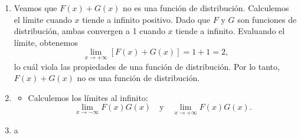 \documentclass{article}
\begin{document}
\begin{enumerate}
\begin{enumerate}[label={(\roman*)}]
        Consideremos \(a \in (0, 1)\) y verifiquemos las propiedades de la función.
        \begin{itemize}
            \item Calculemos los límites al infinito: 
            \[
            \lim_{x \to -\infty} aF(x) + (1 - a)G(x) \quad \text{y} \lim_{x \to +\infty} aF(x) + (1 - a)G(x).
            \]
            Ya que \(F\) y \(G\) son funciones de distribución, su límite cuando \(x\) tiende a infinito negativo es 0, por lo que al evaluar el límite tenemos:
            \[
            \lim_{x \to -\infty} aF(x) + (1 - a)G(x) = a(0) + (1 - a)(0) = 0.
            \]
            Análogamente, cuando \(x\) tiende a infinito positivo, el límite de \(F\) y \(G\) es 1. Por lo tanto,
            \[
            \lim_{x \to +\infty} aF(x) + (1 - a)G(x) = a(1) + (1 - a)(1) = a + 1 - a = 1.
            \]
            \item Dado que \(a \geq 0\), entonces la monotonicidad del primer término \(aF(x)\) es igual a la de \(F(x)\), que es creciente por hipótesis. De forma similar, como \(a \leq 1\), \((1 - a) \geq 0\), por lo que el término \((1 - a)G(x)\) es creciente también. Dado que la suma de funciones crecientes es creciente, se sigue que la función \(aF(x) + (1 - a)G(x)\) es creciente.
            \item Ya que hemos probado que la función es creciente y su valor en sus límites es 0 y 1, se sigue que 
            \[
            0 \leq aF(x) + (1 - a)G(x) \leq 1.
            \]
        \end{itemize}
        Ya que hemos verificado las propiedades, entonces la función \(aF(x) + (1 - a)G(x)\) es una función de distribución.
        \item Veamos que \(F(x) + G(x)\) no es una función de distribución. Calculemos el límite cuando \(x\) tiende a infinito positivo. Dado que \(F\) y \(G\) son funciones de distribución, ambas convergen a 1 cuando \(x\) tiende a infinito. Evaluando el límite, obtenemos 
    \[
    \lim_{x \to +\infty} [F(x) + G(x)] = 1 + 1 = 2,
    \]
    lo cuál viola las propiedades de una función de distribución. Por lo tanto, \(F(x) + G(x)\) no es una función de distribución.
    \item \begin{itemize}
        \item Calculemos los límites al infinito:
        \[
        \lim_{x \to -\infty}F(x)G(x) \quad \text{y} \quad \lim_{x \to +\infty} F(x)G(x).
        \]
    \end{itemize}
    \item a
\end{enumerate}
\end{enumerate}
\end{document}
